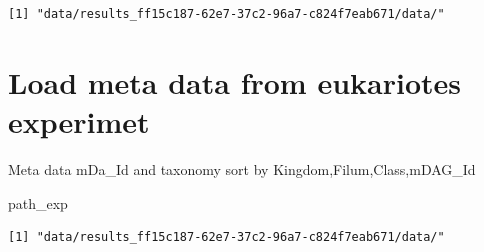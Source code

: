 \documentclass[
  letterpaper,
  DIV=11,
  numbers=noendperiod]{scrreprt}
\newenvironment{Shaded}{\begin{snugshade}}{\end{snugshade}}
\newcommand{\NormalTok}[1]{\textcolor[rgb]{0.00,0.23,0.31}{#1}}
\begin{document}
\begin{verbatim}
[1] "data/results_ff15c187-62e7-37c2-96a7-c824f7eab671/data/"
\end{verbatim}

\hypertarget{load-meta-data-from-eukariotes-experimet}{%
\section*{Load meta data from eukariotes
experimet}\label{load-meta-data-from-eukariotes-experimet}}


Meta data mDa\_Id and taxonomy sort by Kingdom,Filum,Class,mDAG\_Id

\begin{Shaded}
\begin{Highlighting}[]
\NormalTok{path\_exp}
\end{Highlighting}
\end{Shaded}

\begin{verbatim}
[1] "data/results_ff15c187-62e7-37c2-96a7-c824f7eab671/data/"
\end{verbatim}
\end{document}
